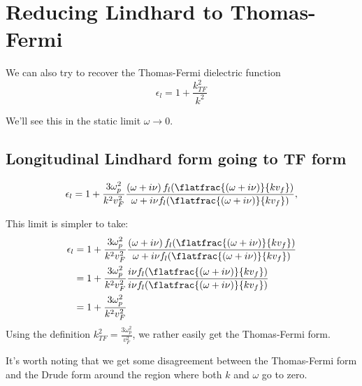 \documentclass[../../main.tex]{subfiles}
\newcommand{\vf}{v_F}
\begin{document}
\section{Reducing Lindhard to Thomas-Fermi}

We can also try to recover the Thomas-Fermi dielectric function
\begin{equation}
	\epsilon_l = 1 + \frac{k_{TF}^2}{k^2}
\end{equation}

We'll see this in the static limit $\omega \rightarrow 0$.

\subsection{Longitudinal Lindhard form going to TF form}
\begin{equation} \label{eq:ReducingLindhard:LindhardEpsToTF}
 \epsilon_l = 1 + \frac{3 \omega_p^2}{k^2 v_F^2} \frac{\left(\omega + i \nu \right) f_l(\flatfrac{(\omega + i \nu)}{k v_f})}{\omega + i \nu f_l(\flatfrac{(\omega + i \nu)}{k v_f})},
\end{equation}

This limit is simpler to take:
\begin{align}
	 \epsilon_l &= 1 + \frac{3 \omega_p^2}{k^2 v_F^2} \frac{\left(\omega + i \nu \right) f_l(\flatfrac{(\omega + i \nu)}{k v_f})}{\omega + i \nu f_l(\flatfrac{(\omega + i \nu)}{k v_f})} \\
	 &= 1 + \frac{3 \omega_p^2}{k^2 v_F^2} \frac{i \nu  f_l(\flatfrac{(\omega + i \nu)}{k v_f})}{  i \nu f_l(\flatfrac{(\omega + i \nu)}{k v_f})} \\
	 &=  1 + \frac{3 \omega_p^2}{k^2 v_F^2}
\end{align}
Using the definition $k_{TF}^2 = \frac{3 \omega_p^2}{\vf^2}$, we rather easily get the Thomas-Fermi form.

It's worth noting that we get some disagreement between the Thomas-Fermi form and the Drude form around the region where both $k$ and $\omega$ go to zero.
\end{document}
